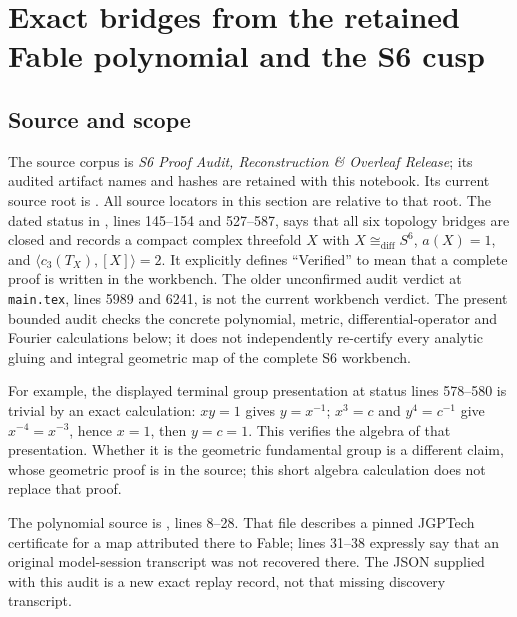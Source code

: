 \section{Exact bridges from the retained Fable polynomial and the S6 cusp}
\label{sec:s6b}

\subsection{Source and scope}
The source corpus is \emph{S6 Proof Audit, Reconstruction \& Overleaf Release};
its audited artifact names and hashes are retained with this notebook.
Its current source root is
.  All source locators
in this section are relative to that root.  The dated status in
,
lines 145--154 and 527--587, says that all six topology bridges are closed and
records a compact complex threefold $X$ with
$X\cong_{\mathrm{diff}}S^6$, $a(X)=1$, and
$\langle c_3(T_X),[X]\rangle=2$.  It explicitly defines ``Verified'' to mean
that a complete proof is written in the workbench.  The older unconfirmed
audit verdict at \texttt{main.tex}, lines 5989 and 6241, is not the current
workbench verdict.  The present bounded audit checks the concrete polynomial,
metric, differential-operator and Fourier calculations below; it does not
independently re-certify every analytic gluing and integral geometric map of
the complete S6 workbench.

For example, the displayed terminal group presentation at status lines
578--580 is trivial by an exact calculation: $xy=1$ gives $y=x^{-1}$;
$x^3=c$ and $y^4=c^{-1}$ give $x^{-4}=x^{-3}$, hence $x=1$, then $y=c=1$.
This verifies the algebra of that presentation.  Whether it is the geometric
fundamental group is a different claim, whose geometric proof is in the
source; this short algebra calculation does not replace that proof.

The polynomial source is
,
lines 8--28.  That file describes a pinned JGPTech certificate for a map
attributed there to Fable; lines 31--38 expressly say that an original
model-session transcript was not recovered there.  The JSON supplied with
this audit is a new exact replay record, not that missing discovery transcript.

